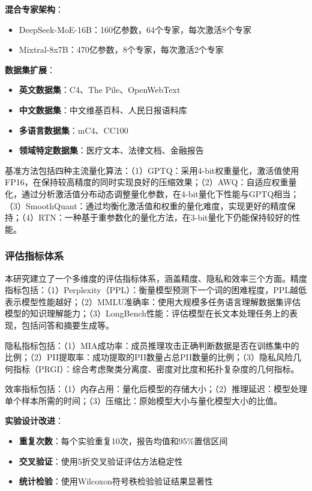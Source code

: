 \textbf{混合专家架构}：
\begin{itemize}
\item DeepSeek-MoE-16B：160亿参数，64个专家，每次激活8个专家
\item Mixtral-8x7B：470亿参数，8个专家，每次激活2个专家
\end{itemize}

\textbf{数据集扩展}：
\begin{itemize}
\item \textbf{英文数据集}：C4、The Pile、OpenWebText
\item \textbf{中文数据集}：中文维基百科、人民日报语料库
\item \textbf{多语言数据集}：mC4、CC100
\item \textbf{领域特定数据集}：医疗文本、法律文档、金融报告
\end{itemize}

基准方法包括四种主流量化算法：（1）GPTQ：采用4-bit权重量化，激活值使用FP16，在保持较高精度的同时实现良好的压缩效果；（2）AWQ：自适应权重量化，通过分析激活值分布动态调整量化参数，在4-bit量化下性能与GPTQ相当；（3）SmoothQuant：通过均衡化激活值和权重的量化难度，实现更好的精度保持；（4）RTN：一种基于重参数化的量化方法，在3-bit量化下仍能保持较好的性能。

\subsubsection{评估指标体系}

本研究建立了一个多维度的评估指标体系，涵盖精度、隐私和效率三个方面。精度指标包括：（1）Perplexity（PPL）：衡量模型预测下一个词的困难程度，PPL越低表示模型性能越好；（2）MMLU准确率：使用大规模多任务语言理解数据集评估模型的知识理解能力；（3）LongBench性能：评估模型在长文本处理任务上的表现，包括问答和摘要生成等。

隐私指标包括：（1）MIA成功率：成员推理攻击正确判断数据是否在训练集中的比例；（2）PII提取率：成功提取的PII数量占总PII数量的比例；（3）隐私风险几何指标（PRGI）：综合考虑聚类分离度、密度对比度和拓扑复杂度的几何指标。

效率指标包括：（1）内存占用：量化后模型的存储大小；（2）推理延迟：模型处理单个样本所需的时间；（3）压缩比：原始模型大小与量化模型大小的比值。

\textbf{实验设计改进}：
\begin{itemize}
\item \textbf{重复次数}：每个实验重复10次，报告均值和95\%置信区间
\item \textbf{交叉验证}：使用5折交叉验证评估方法稳定性
\item \textbf{统计检验}：使用Wilcoxon符号秩检验验证结果显著性
\end{itemize}

